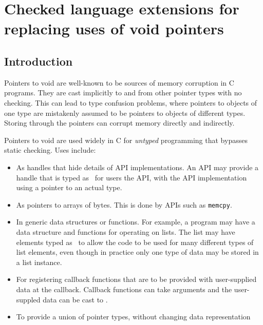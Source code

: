 
\chapter{Checked language extensions for replacing uses of void pointers}

\section{Introduction}

Pointers to void are well-known to be sources of memory corruption in C
programs. They are cast implicitly to and from other pointer types with no checking.
This can lead to type confusion problems, where pointers to objects of one type are mistakenly
assumed to be pointers to objects of different types.  Storing through the pointers
can corrupt memory directly and indirectly.

Pointers to void are used widely in C for {\em untyped} programming that bypasses
static checking.  Uses include:
\begin{itemize}
\item As handles that hide details of API implementations.  An
API may provide a handle that is typed as \uncheckedptrvoid\ for 
users the API, with the API implementation using a pointer to an actual
type.
\item As pointers to arrays of bytes.  This is done by APIs such as \lstinline+memcpy+.
\item In generic data structures or functions. For example, 
a program may have a data structure and functions for operating on lists. 
The list may  have elements typed as \uncheckedptrvoid\ to allow the code
to be used for many different types of list elements, 
even though in practice only one type of data may be stored in a list instance. 
\item For registering callback functions that are to be provided with 
user-supplied data at the callback.  Callback functions can take \uncheckedptrvoid{} arguments and 
the user-suppled data can be cast to \uncheckedptrvoid{}.
\item To provide a union of pointer types, without changing data representation
\end{itemize}

